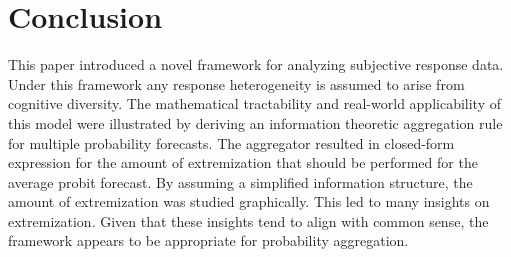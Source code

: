 \documentclass[11pt,twoside]{article}
\begin{document}
%


%


\section{Conclusion}
This paper introduced a novel framework for analyzing subjective response data. Under this framework any response heterogeneity is assumed to arise from cognitive diversity. The mathematical tractability and real-world applicability of this model were illustrated by deriving an information theoretic aggregation rule for multiple probability forecasts. The aggregator resulted in closed-form expression for the amount of extremization that should be performed for the average probit forecast. By assuming a simplified information structure, the amount of extremization was studied graphically. This led to many insights on extremization. Given that these insights tend to align with common sense, the framework appears to be appropriate for probability aggregation.
\end{document}
